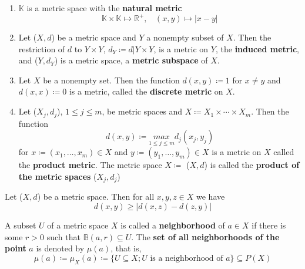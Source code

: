 \begin{eg}
    \begin{enumerate}[label = (\alph*)]
        \item \(\mathbb{K}\) is a metric space with the \textbf{natural metric}
        \[
            \mathbb{K} \times \mathbb{K} \mapsto \mathbb{R}^+ , \:\:\:\: (x, y) \mapsto \left | x - y \right |  
        \]
        \item Let (\(X, d\)) be a metric space and \(Y\) a nonempty subset of \(X\). Then the 
        restriction of \(d\) to \(Y \times Y\), \(d_Y \coloneqq d|Y \times Y\), is a metric
        on \(Y\), the \textbf{induced metric}, and (\(Y, d_Y\)) is a metric space, a 
        \textbf{metric subspace} of \(X\). 
        \item Let \(X\) be a nonempty set. Then the function \(d\left(x, y\right) \coloneqq 1\)
        for \(x \neq y\) and \(d\left(x, x\right) \coloneqq 0 \) is a metric, called 
        the \textbf{discrete metric} on \(X\). 
        \item Let (\(X_j, d_j\)), \(1 \leq j \leq m\), be metric spaces and 
        \(X \coloneqq X_1 \times \cdots \times X_m\). Then the function 
        \[
            d(x, y) \coloneqq \underset{1 \leq j \leq m}{max} d_j(x_j, y_j)  
        \]
        for \(x \coloneqq \left(x_1, \ldots, x_m\right) \in X\) and \(y \coloneqq \left(y_1, \ldots, y_m\right) \in X\)
        is a metric on \(X\) called the \textbf{product metric}. The metric space \(X \coloneqq\)
        (\(X, d\)) is called the \textbf{product of the metric spaces} (\(X_j, d_j\))
    \end{enumerate}
\end{eg}

\begin{proposition}
    Let (\(X, d\)) be a metric space. Then for all \(x, y, z \in X\) we have 
    \[
        d(x, y) \geq \left |  d(x, z) - d(z, y) \right |  
    \]
\end{proposition}

\begin{note}
    A subset \(U\) of a metric space \(X\) is called a \textbf{neighborhood} of \(a \in X\)
    if there is some \(r > 0\) such that \(\mathbb{B}\left(a, r\right) \subseteq U\). The
    \textbf{set of all neighborhoods of the point} \(a\) is denoted by \(\mu\left(a\right)\),
    that is, 
    \[
        \mu(a) \coloneqq \mu_X (a) \coloneqq \{ U \subseteq X ; U \text{ is a neighborhood of } a \}
        \subseteq P(X)  
    \]
\end{note}

